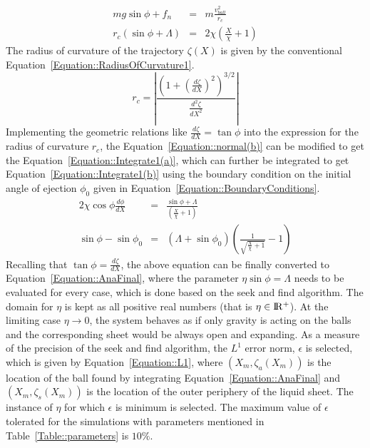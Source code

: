 \documentclass[%
aip,
sd,%
amsmath,amssymb,
preprint,%
author-year,%
]{revtex4-1}
\begin{document}
\begin{subequations}
	\label{Equation::Normal}
	\begin{eqnarray}
	\label{Equation::normal(a)}
	mg\sin\phi + f_n &=& m\frac{v_{ball}^2}{r_c}\\
	r_c\left(\sin\phi + \Lambda\right) &=& 2\chi\left(\frac{X}{\chi} + 1\right)
	\label{Equation::normal(b)}
	\end{eqnarray}
\end{subequations}
The radius of curvature of the trajectory $\zeta(X)$ is given by the conventional Equation~\ref{Equation::RadiusOfCurvature1}.
\begin{equation}\label{Equation::RadiusOfCurvature1}
	r_c = \left|\frac{\left(1+\left(\frac{d\zeta}{dX}\right)^2\right)^{3/2}}{\frac{d^2\zeta}{dX^2}}\right| 
\end{equation}
Implementing the geometric relations like $\frac{d\zeta}{dX} = \tan\phi$ into the expression for the radius of curvature $r_c$, the Equation~\ref{Equation::normal(b)} can be modified to get the  Equation~\ref{Equation::Integrate1(a)}, which can further be integrated to get Equation~\ref{Equation::Integrate1(b)} using the boundary condition on the initial angle of ejection $\phi_0$ given in Equation~\ref{Equation::BoundaryConditions}.
\begin{subequations}
	\label{Equation::Integrate1}
	\begin{eqnarray}
	\label{Equation::Integrate1(a)}
	2\chi\cos\phi\frac{d\phi}{dX} &=& \frac{\sin\phi + \Lambda}{\left(\frac{X}{\chi} + 1\right)}\\
	\sin\phi - \sin\phi_0 &=& \left(\Lambda + \sin\phi_0\right)\left(\frac{1}{\sqrt{\frac{X}{\chi} + 1}} - 1\right)	
	\label{Equation::Integrate1(b)}
	\end{eqnarray}
\end{subequations}
Recalling that $\tan\phi = \frac{d\zeta}{dX}$, the above equation can be finally converted to Equation~\ref{Equation::AnaFinal}, where the parameter $\eta\sin\phi = \Lambda$ needs to be evaluated for every case, which is done based on the seek and find algorithm. The domain for $\eta$ is kept as all positive real numbers (that is $\eta \in \rm I\!R^+$). At the limiting case $\eta \to 0$, the system behaves as if only gravity is acting on the balls and the corresponding sheet would be always open and expanding. As a measure of the precision of the seek and find algorithm, the $L^1$ error norm, $\epsilon$ is selected, which is given by Equation~\ref{Equation::L1}, where $(X_m,\zeta_a(X_m))$ is the location of the ball found by integrating Equation~\ref{Equation::AnaFinal} and $(X_m,\zeta_s(X_m))$ is the location of the outer periphery of the liquid sheet. The instance of $\eta$ for which $\epsilon$ is minimum is selected. The maximum value of $\epsilon$ tolerated for the simulations with parameters mentioned in Table~\ref{Table::parameters} is $10\%$.  
\end{document}
